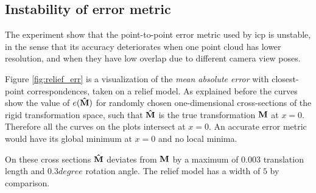 \subsection{Instability of error metric}
The experiment show that the point-to-point error metric used by \gls{icp} is unstable, in the sense that its accuracy deteriorates when one point cloud has lower resolution, and when they have low overlap due to different camera view poses.

Figure \ref{fig:relief_err} is a visualization of the \emph{mean absolute error} with closest-point correspondences, taken on a relief model. As explained before the curves show the value of $e(\mathbf{\hat{M}})$ for randomly chosen one-dimensional cross-sections of the rigid transformation space, such that $\mathbf{\hat{M}}$ is the true transformation $\mathbf{M}$ at $x = 0$. Therefore all the curves on the plots intersect at $x = 0$. An accurate error metric would have its global minimum at $x = 0$ and no local minima.

On these cross sections $\mathbf{\hat{M}}$ deviates from $\mathbf{M}$ by a maximum of $0.003$ translation length and $0.3\si{degree}$ rotation angle. The relief model has a width of $5$ by comparison.

